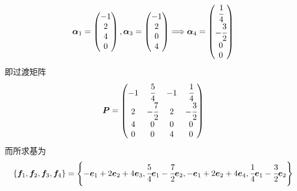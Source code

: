 \begin{brown}
\begin{solution}
\[    \bm{\alpha}_1=\begin{pmatrix}
        -1\\2\\4\\0
    \end{pmatrix},\bm{\alpha}_3=\begin{pmatrix}
        -1\\2\\0\\4
    \end{pmatrix}\Longrightarrow\bm{\alpha}_4=\begin{pmatrix}
        \cfrac{1}{4}\\-\cfrac{3}{2}\\0\\0
    \end{pmatrix}
    \]
即过渡矩阵\[
\bm{P}=\begin{pmatrix}
    -1&\cfrac{5}{4}&-1&\cfrac{1}{4}\\
    2&-\cfrac{7}{2}&2&-\cfrac{3}{2}\\
    4&0&0&0\\
    0&0&4&0
\end{pmatrix}
\]而所求基为\[
\left\{
    \bm{f}_1,\bm{f}_2,\bm{f}_3,\bm{f}_4
\right\}=\left\{
    -\bm{e}_1+2\bm{e}_2+4\bm{e}_3,\cfrac{5}{4}\bm{e}_1-\cfrac{7}{2}\bm{e}_2,-\bm{e}_1+2\bm{e}_2+4\bm{e}_4,\cfrac{1}{4}\bm{e}_1-\cfrac{3}{2}\bm{e}_2
\right\}
\]
\end{solution}
\end{brown}
